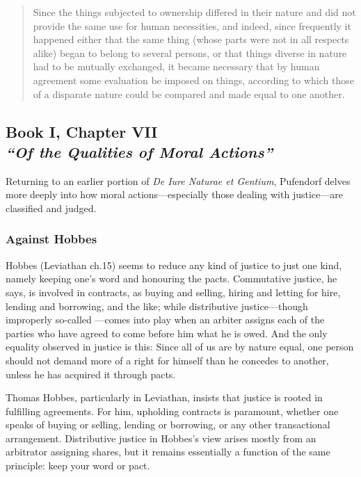             \begin{quote}
                Since the things subjected to ownership differed in their nature and did not provide the same use for human necessities, and indeed, since frequently it happened either that the same thing (whose parts were not in all respects alike) began to belong to several persons, or that things diverse in nature had to be mutually exchanged, it became necessary that by human agreement some evaluation be imposed on things, according to which those of a disparate nature could be compared and made equal to one another.
            \end{quote}

    \subsection[Of the Qualities of Moral Actions]{Book I, Chapter VII\\
                \textit{“Of the Qualities of Moral Actions”}}

        Returning to an earlier portion of \textit{De Iure Naturae et Gentium}, Pufendorf delves more deeply into how moral actions—especially those dealing with justice—are classified and judged.

        \subsubsection{Against Hobbes}
        
            Hobbes (Leviathan ch.15) seems to reduce any kind of justice to just one kind, namely keeping one’s word and honouring the pacts. Commutative justice, he says, is involved in contracts, as buying and selling, hiring and letting for hire, lending and borrowing, and the like; while distributive justice—though improperly so-called —comes into play when an arbiter assigns each of the parties who have agreed to come before him what he is owed. And the only equality observed in justice is this: Since all of us are by nature equal, one person should not demand more of a right for himself than he concedes to another, unless he has acquired it through pacts.

            Thomas Hobbes, particularly in Leviathan, insists that justice is rooted in fulfilling agreements. For him, upholding contracts is paramount, whether one speaks of buying or selling, lending or borrowing, or any other transactional arrangement. Distributive justice in Hobbes’s view arises mostly from an arbitrator assigning shares, but it remains essentially a function of the same principle: keep your word or pact.

